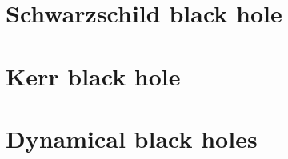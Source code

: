 \documentclass[12pt,a4paper]{book}
\begin{document}



\part{Schwarzschild black hole} \label{P:sch}





\part{Kerr black hole} \label{P:ker}





\part{Dynamical black holes}







\end{document}

